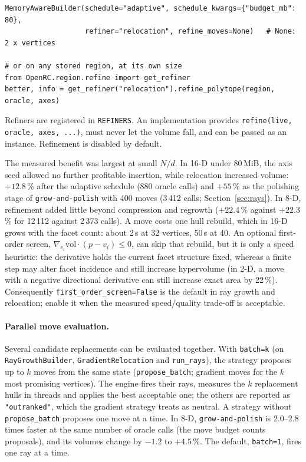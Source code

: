 \documentclass[11pt,a4paper]{report}
\newcommand{\code}[1]{\texttt{\small #1}}
\begin{document}
\begin{lstlisting}
MemoryAwareBuilder(schedule="adaptive", schedule_kwargs={"budget_mb": 80},
                   refiner="relocation", refine_moves=None)   # None: 2 x vertices

# or on any stored region, at its own size
from OpenRC.region.refine import get_refiner
better, info = get_refiner("relocation").refine_polytope(region, oracle, axes)
\end{lstlisting}

Refiners are registered in \code{REFINERS}. An implementation provides
\code{refine(live, oracle, axes, ...)}, must never let the volume fall, and can
be passed as an instance. Refinement is disabled by default.

The measured benefit was largest at small $N/d$. In 16-D under 80\,MiB,
the axis seed allowed no further profitable insertion, while relocation
increased volume:
$+12.8$\,\% after the adaptive schedule (880 oracle calls) and $+55$\,\% as
the polishing stage of \code{grow-and-polish} with 400 moves (3\,412 calls;
Section~\ref{sec:rays}). In 8-D, refinement added little beyond compression
and regrowth ($+22.4$\,\% against $+22.3$\,\% for 12\,112 against 2\,373 calls). A
move costs one hull rebuild, which in 16-D grows with the facet count: about
2\,s at 32 vertices, 50\,s at 40. An optional first-order screen,
$\nabla_{v_i}\mathrm{vol}\cdot(p - v_i) \le 0$, can skip that rebuild, but it is
only a speed heuristic: the derivative holds the current facet structure fixed,
whereas a finite step may alter facet incidence and still increase hypervolume
(in 2-D, a move with a negative directional derivative can still increase exact
area by 22\,\%). Consequently
\code{first\_order\_screen=False} is the default in ray growth and relocation;
enable it when the measured speed/quality trade-off is acceptable.

\paragraph{Parallel move evaluation.} Several candidate replacements can be
evaluated together. With \code{batch=k} (on
\code{RayGrowthBuilder}, \code{GradientRelocation} and \code{run\_rays}), the
strategy proposes up to $k$ moves from the same state (\code{propose\_batch};
gradient moves for the $k$ most promising vertices). The engine fires their
rays, measures the $k$ replacement hulls in threads and applies the best
acceptable one; the others are reported as \code{"outranked"}, which the
gradient strategy treats as neutral. A strategy without \code{propose\_batch}
proposes one move at a time. In 8-D, \code{grow-and-polish} is
2.0--2.8 times faster at the same number of oracle calls (the move budget counts
proposals), and its volumes change by $-1.2$ to $+4.5\,\%$. The default,
\code{batch=1}, fires one ray at a time.
\end{document}
